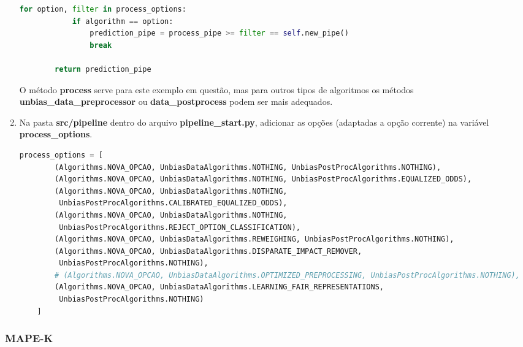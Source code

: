 \documentclass[Portugues,Final]{ic-tese-v3}
\begin{document}
\begin{enumerate}
\begin{lstlisting}[language=Python, label=cod:ProcessAlgorithm]
        for option, filter in process_options:
            if algorithm == option:
                prediction_pipe = process_pipe >= filter == self.new_pipe()
                break

        return prediction_pipe
\end{lstlisting}

O método \textbf{process} serve para este exemplo em questão, mas para outros tipos de algoritmos os métodos \textbf{unbias\_data\_preprocessor} ou \textbf{data\_postprocess} podem ser mais adequados.

\item Na pasta \textbf{src/pipeline} dentro do arquivo \textbf{pipeline\_start.py}, adicionar as opções (adaptadas a opção corrente) na variável \textbf{process\_options}.

\begin{lstlisting}[language=Python, label=cod:ParserAddArgumentPipeline]
    process_options = [
        (Algorithms.NOVA_OPCAO, UnbiasDataAlgorithms.NOTHING, UnbiasPostProcAlgorithms.NOTHING),
        (Algorithms.NOVA_OPCAO, UnbiasDataAlgorithms.NOTHING, UnbiasPostProcAlgorithms.EQUALIZED_ODDS),
        (Algorithms.NOVA_OPCAO, UnbiasDataAlgorithms.NOTHING,
         UnbiasPostProcAlgorithms.CALIBRATED_EQUALIZED_ODDS),
        (Algorithms.NOVA_OPCAO, UnbiasDataAlgorithms.NOTHING,
         UnbiasPostProcAlgorithms.REJECT_OPTION_CLASSIFICATION),
        (Algorithms.NOVA_OPCAO, UnbiasDataAlgorithms.REWEIGHING, UnbiasPostProcAlgorithms.NOTHING),
        (Algorithms.NOVA_OPCAO, UnbiasDataAlgorithms.DISPARATE_IMPACT_REMOVER,
         UnbiasPostProcAlgorithms.NOTHING),
        # (Algorithms.NOVA_OPCAO, UnbiasDataAlgorithms.OPTIMIZED_PREPROCESSING, UnbiasPostProcAlgorithms.NOTHING),
        (Algorithms.NOVA_OPCAO, UnbiasDataAlgorithms.LEARNING_FAIR_REPRESENTATIONS,
         UnbiasPostProcAlgorithms.NOTHING)
    ]
\end{lstlisting}

\end{enumerate}

\subsubsection{MAPE-K}
\end{document}
